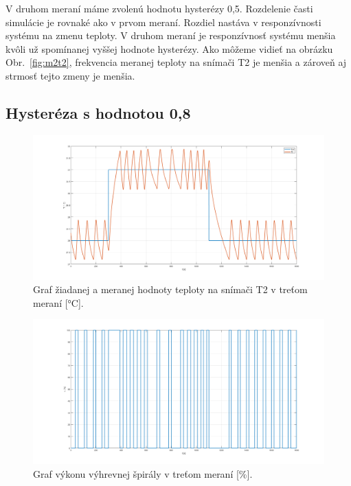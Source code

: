 \documentclass{article}
\begin{document}
V druhom meraní máme zvolenú hodnotu hysterézy 0,5. Rozdelenie časti simulácie je rovnaké ako v prvom meraní.
Rozdiel nastáva v responzívnosti systému na zmenu teploty. V druhom meraní je responzívnosť systému menšia
kvôli už spomínanej vyššej hodnote hysterézy. Ako môžeme vidieť na obrázku Obr.~\ref{fig:m2t2}, frekvencia
meranej teploty na snímači T2 je menšia a zároveň aj strmosť tejto zmeny je menšia.

\subsection{Hysteréza s hodnotou 0,8}
\label{sec:meranie3}

\begin{figure}[!htbp]
	\begin{center}
		\includegraphics[width=\textwidth]{./include/m3T2.png}
	\end{center}
	\caption{Graf žiadanej a meranej hodnoty teploty na snímači T2 v treťom meraní [°C].}
	\label{fig:m3t2}
\end{figure}

\clearpage

\begin{figure}[!htbp]
	\begin{center}
		\includegraphics[width=\textwidth]{./include/m3u.png}
	\end{center}
	\caption{Graf výkonu výhrevnej špirály v treťom meraní [\%].}
	\label{fig:m3u}
\end{figure}
\end{document}
